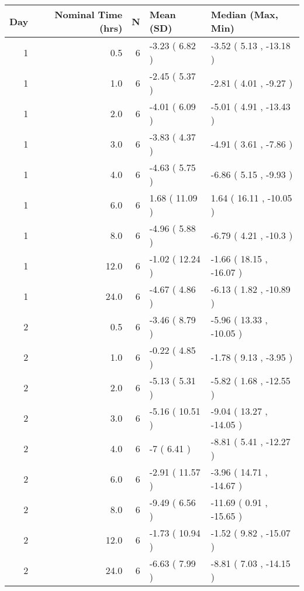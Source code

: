 
\begin{tabular}{rrrll}
\toprule
Day & Nominal Time (hrs) & N & Mean (SD) & Median (Max, Min)\\
\midrule
1 & 0.5 & 6 & -3.23 ( 6.82 ) & -3.52 ( 5.13 , -13.18 )\\
1 & 1.0 & 6 & -2.45 ( 5.37 ) & -2.81 ( 4.01 , -9.27 )\\
1 & 2.0 & 6 & -4.01 ( 6.09 ) & -5.01 ( 4.91 , -13.43 )\\
1 & 3.0 & 6 & -3.83 ( 4.37 ) & -4.91 ( 3.61 , -7.86 )\\
1 & 4.0 & 6 & -4.63 ( 5.75 ) & -6.86 ( 5.15 , -9.93 )\\
1 & 6.0 & 6 & 1.68 ( 11.09 ) & 1.64 ( 16.11 , -10.05 )\\
1 & 8.0 & 6 & -4.96 ( 5.88 ) & -6.79 ( 4.21 , -10.3 )\\
1 & 12.0 & 6 & -1.02 ( 12.24 ) & -1.66 ( 18.15 , -16.07 )\\
1 & 24.0 & 6 & -4.67 ( 4.86 ) & -6.13 ( 1.82 , -10.89 )\\
2 & 0.5 & 6 & -3.46 ( 8.79 ) & -5.96 ( 13.33 , -10.05 )\\
2 & 1.0 & 6 & -0.22 ( 4.85 ) & -1.78 ( 9.13 , -3.95 )\\
2 & 2.0 & 6 & -5.13 ( 5.31 ) & -5.82 ( 1.68 , -12.55 )\\
2 & 3.0 & 6 & -5.16 ( 10.51 ) & -9.04 ( 13.27 , -14.05 )\\
2 & 4.0 & 6 & -7 ( 6.41 ) & -8.81 ( 5.41 , -12.27 )\\
2 & 6.0 & 6 & -2.91 ( 11.57 ) & -3.96 ( 14.71 , -14.67 )\\
2 & 8.0 & 6 & -9.49 ( 6.56 ) & -11.69 ( 0.91 , -15.65 )\\
2 & 12.0 & 6 & -1.73 ( 10.94 ) & -1.52 ( 9.82 , -15.07 )\\
2 & 24.0 & 6 & -6.63 ( 7.99 ) & -8.81 ( 7.03 , -14.15 )\\
\bottomrule
\end{tabular}
